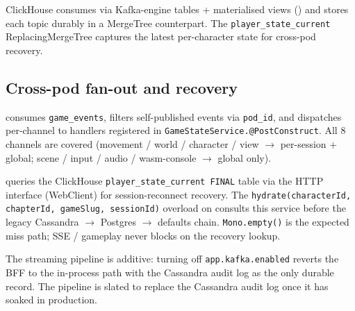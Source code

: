 ClickHouse consumes via Kafka-engine tables + materialised views
() and stores
each topic durably in a MergeTree counterpart. The
\texttt{player\_state\_current} ReplacingMergeTree captures the latest
per-character state for cross-pod recovery.

\subsection{Cross-pod fan-out and recovery}

 consumes \texttt{game\_events},
filters self-published events via \texttt{pod\_id}, and dispatches
per-channel to handlers registered in
\texttt{GameStateService.@PostConstruct}. All 8 channels are covered
(movement / world / character / view $\rightarrow$ per-session +
global; scene / input / audio / wasm-console $\rightarrow$ global
only).

 queries the ClickHouse
\texttt{player\_state\_current FINAL} table via the HTTP interface
(WebClient) for session-reconnect recovery. The
\texttt{hydrate(characterId, chapterId, gameSlug, sessionId)} overload
on  consults this service before the legacy
Cassandra $\rightarrow$ Postgres $\rightarrow$ defaults chain.
\texttt{Mono.empty()} is the expected miss path; SSE / gameplay never
blocks on the recovery lookup.

\begin{snapnote}
The streaming pipeline is additive: turning off
\texttt{app.kafka.enabled} reverts the BFF to the in-process path with
the Cassandra audit log as the only durable record. The pipeline is
slated to replace the Cassandra audit log once it has soaked in
production.
\end{snapnote}
